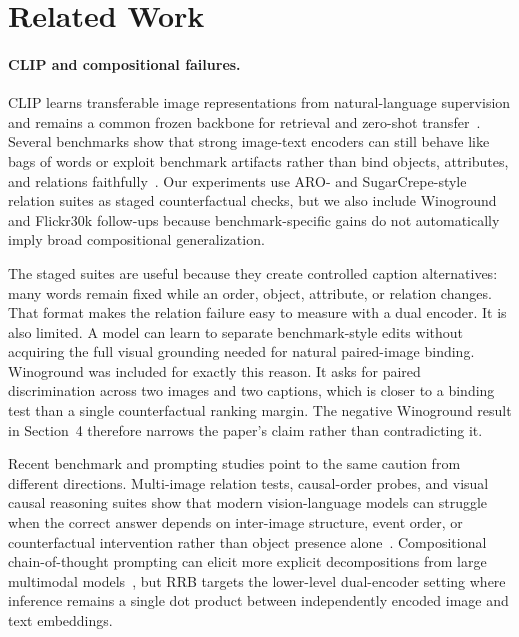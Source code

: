 \section{Related Work}

\paragraph{CLIP and compositional failures.}
CLIP learns transferable image representations from natural-language supervision and remains a common frozen backbone for retrieval and zero-shot transfer~\cite{radford2021clip,ilharco2021openclip}. Several benchmarks show that strong image-text encoders can still behave like bags of words or exploit benchmark artifacts rather than bind objects, attributes, and relations faithfully~\cite{yuksekgonul2022bags,hsieh2023sugarcrepe,thrush2022winoground}. Our experiments use ARO- and SugarCrepe-style relation suites as staged counterfactual checks, but we also include Winoground and Flickr30k follow-ups because benchmark-specific gains do not automatically imply broad compositional generalization.

The staged suites are useful because they create controlled caption alternatives: many words remain fixed while an order, object, attribute, or relation changes. That format makes the relation failure easy to measure with a dual encoder. It is also limited. A model can learn to separate benchmark-style edits without acquiring the full visual grounding needed for natural paired-image binding. Winoground was included for exactly this reason. It asks for paired discrimination across two images and two captions, which is closer to a binding test than a single counterfactual ranking margin. The negative Winoground result in Section~4 therefore narrows the paper's claim rather than contradicting it.

Recent benchmark and prompting studies point to the same caution from different directions. Multi-image relation tests, causal-order probes, and visual causal reasoning suites show that modern vision-language models can struggle when the correct answer depends on inter-image structure, event order, or counterfactual intervention rather than object presence alone~\cite{zong2024mirb,komanduri2025causalvlbench,weng2026causalorder}. Compositional chain-of-thought prompting can elicit more explicit decompositions from large multimodal models~\cite{mitra2024ccot}, but RRB targets the lower-level dual-encoder setting where inference remains a single dot product between independently encoded image and text embeddings.

